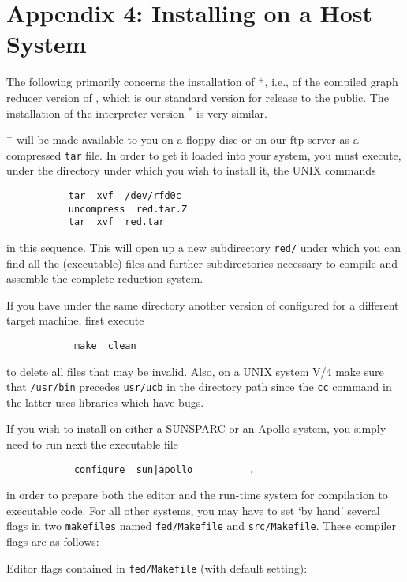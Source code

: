 \section*{Appendix 4: Installing \pired on a Host System}

The following primarily concerns the installation of \pired$^+$, i.e., of the
 compiled graph reducer version of \pired, which is our standard version for
release to the public. The installation of the interpreter
 version \pired$^*$ is very similar.

\pired$^+$ will be made available to you on a floppy disc or on our ftp-server as a compressed
 {\tt tar} file. In order to get it loaded into your system, you must
execute, under the directory under which you wish to install it, the
UNIX commands 
\begin{verbatim}
           tar  xvf  /dev/rfd0c 
           uncompress  red.tar.Z 
           tar  xvf  red.tar
\end{verbatim}
in this sequence. This will open up a new subdirectory {\tt red/} under
 which you can find all the (executable) files and further subdirectories 
necessary to compile and assemble the complete reduction system. 

If you have under the same directory another version of \pired configured for a
different target machine, first execute
\begin{verbatim}
            make  clean
\end{verbatim}
to delete all files that may be invalid. Also, on a UNIX system V/4 
make sure that {\tt /usr/bin} precedes  {\tt usr/ucb} in the directory path
since the {\tt cc} command in the latter uses libraries which have bugs.

If you wish to install \pired on either a SUNSPARC or an Apollo system,
you simply need to run next the executable file 
\begin{verbatim}
            configure  sun|apollo          .
\end{verbatim}
in order to prepare both the editor and the run-time system 
 for compilation to executable code.
For all other systems, you may have to set `by hand' several flags in two
{\tt makefiles} named {\tt fed/Makefile} and {\tt src/Makefile}. These
compiler flags are as follows:

\vspace{5mm}

\noindent Editor flags contained in {\tt fed/Makefile} (with default setting):
 
